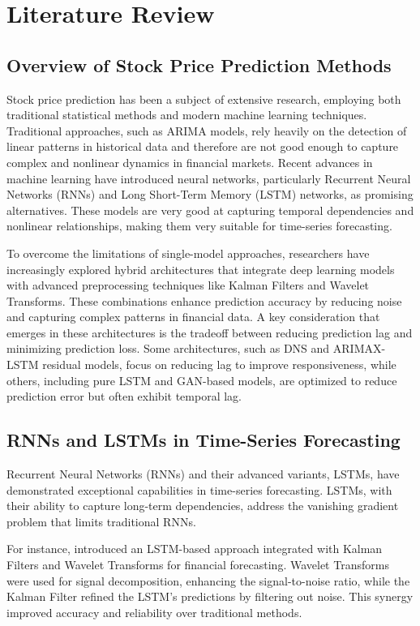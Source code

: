 \chapter{Literature Review}

\section{Overview of Stock Price Prediction Methods}
Stock price prediction has been a subject of extensive research, employing both traditional statistical methods and modern machine learning techniques. Traditional approaches, such as ARIMA models, rely heavily on the detection of linear patterns in historical data and therefore are not good enough to capture complex and nonlinear dynamics in financial markets. Recent advances in machine learning have introduced neural networks, particularly Recurrent Neural Networks (RNNs) and Long Short-Term Memory (LSTM) networks, as promising alternatives. These models are very good at capturing temporal dependencies and nonlinear relationships, making them very suitable for time-series forecasting.

To overcome the limitations of single-model approaches, researchers have increasingly explored hybrid architectures that integrate deep learning models with advanced preprocessing techniques like Kalman Filters and Wavelet Transforms. These combinations enhance prediction accuracy by reducing noise and capturing complex patterns in financial data. A key consideration that emerges in these architectures is the tradeoff between reducing prediction lag and minimizing prediction loss. Some architectures, such as DNS and ARIMAX-LSTM residual models, focus on reducing lag to improve responsiveness, while others, including pure LSTM and GAN-based models, are optimized to reduce prediction error but often exhibit temporal lag.

\section{RNNs and LSTMs in Time-Series Forecasting}
Recurrent Neural Networks (RNNs) and their advanced variants, LSTMs, have demonstrated exceptional capabilities in time-series forecasting. LSTMs, with their ability to capture long-term dependencies, address the vanishing gradient problem that limits traditional RNNs.

For instance, \textcite{dastgerdi_investigating_2022} introduced an LSTM-based approach integrated with Kalman Filters and Wavelet Transforms for financial forecasting. Wavelet Transforms were used for signal decomposition, enhancing the signal-to-noise ratio, while the Kalman Filter refined the LSTM’s predictions by filtering out noise. This synergy improved accuracy and reliability over traditional methods.

